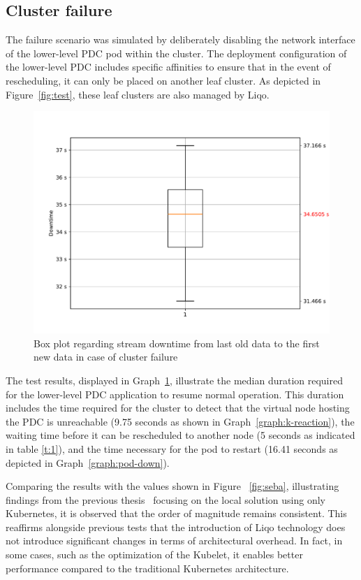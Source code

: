 \subsection{Cluster failure}
The failure scenario was simulated by deliberately disabling the network interface of the lower-level PDC pod within the cluster. The deployment configuration of the lower-level PDC includes specific affinities to ensure that in the event of rescheduling, it can only be placed on another leaf cluster. As depicted in Figure~\ref{fig:test}, these leaf clusters are also managed by Liqo.

\begin{figure}[ht]\centering
\includegraphics[scale=0.4]{Pictures/pdc-cluster-down}
\caption{Box plot regarding stream downtime from last old data to the first new data in case of cluster failure}\label{graph:cluster-down}
\end{figure}

The test results, displayed in Graph~\ref{graph:cluster-down}, illustrate the median duration required for the lower-level PDC application to resume normal operation. This duration includes the time required for the cluster to detect that the virtual node hosting the PDC is unreachable (9.75 seconds as shown in Graph~\ref{graph:k-reaction}), the waiting time before it can be rescheduled to another node (5 seconds as indicated in table \ref{t:1}), and the time necessary for the pod to restart (16.41 seconds as depicted in Graph~\ref{graph:pod-down}).

Comparing the results with the values shown in Figure ~\ref{fig:seba}, illustrating findings from the previous thesis~\cite{e3-1} focusing on the local solution using only Kubernetes, it is observed that the order of magnitude remains consistent. This reaffirms alongside previous tests that the introduction of Liqo technology does not introduce significant changes in terms of architectural overhead. In fact, in some cases, such as the optimization of the Kubelet, it enables better performance compared to the traditional Kubernetes architecture.


